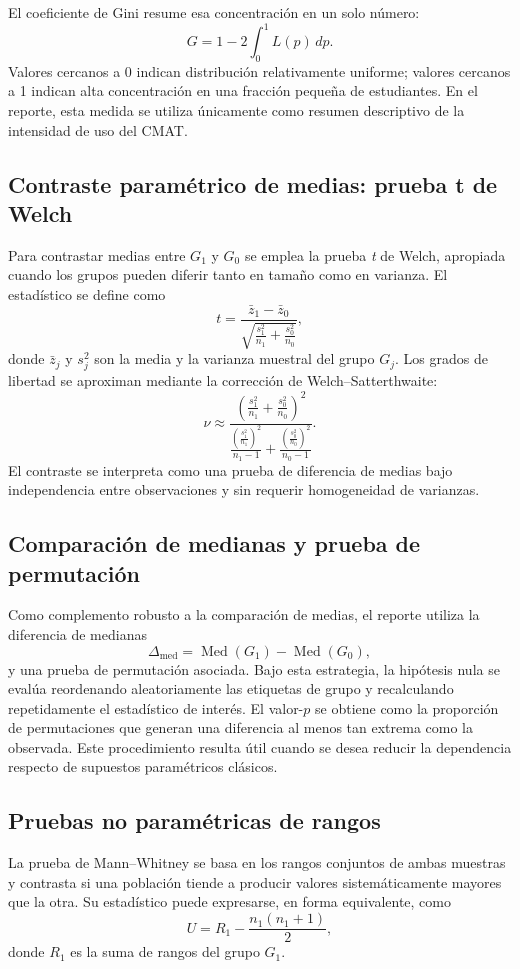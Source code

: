 \documentclass[8pt,a4paper]{article} %
\numberwithin{figure}{subsection}
\begin{document}
El coeficiente de Gini resume esa concentración en un solo número:
\[
G = 1 - 2\int_0^1 L(p)\,dp.
\]
Valores cercanos a 0 indican distribución relativamente uniforme; valores cercanos a 1 indican alta concentración en una fracción pequeña de estudiantes. En el reporte, esta medida se utiliza únicamente como resumen descriptivo de la intensidad de uso del CMAT.

\subsection{Contraste paramétrico de medias: prueba t de Welch}
Para contrastar medias entre $G_1$ y $G_0$ se emplea la prueba \textit{t} de Welch, apropiada cuando los grupos pueden diferir tanto en tamaño como en varianza. El estadístico se define como
\[
t=\frac{\bar z_1-\bar z_0}{\sqrt{\frac{s_1^2}{n_1}+\frac{s_0^2}{n_0}}},
\]
donde $\bar z_j$ y $s_j^2$ son la media y la varianza muestral del grupo $G_j$. Los grados de libertad se aproximan mediante la corrección de Welch--Satterthwaite:
\[
\nu \approx
\frac{\left(\frac{s_1^2}{n_1}+\frac{s_0^2}{n_0}\right)^2}
{\frac{\left(\frac{s_1^2}{n_1}\right)^2}{n_1-1}+\frac{\left(\frac{s_0^2}{n_0}\right)^2}{n_0-1}}.
\]
El contraste se interpreta como una prueba de diferencia de medias bajo independencia entre observaciones y sin requerir homogeneidad de varianzas.

\subsection{Comparación de medianas y prueba de permutación}
Como complemento robusto a la comparación de medias, el reporte utiliza la diferencia de medianas
\[
\Delta_{\mathrm{med}}=\operatorname{Med}(G_1)-\operatorname{Med}(G_0),
\]
y una prueba de permutación asociada. Bajo esta estrategia, la hipótesis nula se evalúa reordenando aleatoriamente las etiquetas de grupo y recalculando repetidamente el estadístico de interés. El valor-$p$ se obtiene como la proporción de permutaciones que generan una diferencia al menos tan extrema como la observada. Este procedimiento resulta útil cuando se desea reducir la dependencia respecto de supuestos paramétricos clásicos.

\subsection{Pruebas no paramétricas de rangos}
La prueba de Mann--Whitney se basa en los rangos conjuntos de ambas muestras y contrasta si una población tiende a producir valores sistemáticamente mayores que la otra. Su estadístico puede expresarse, en forma equivalente, como
\[
U = R_1-\frac{n_1(n_1+1)}{2},
\]
donde $R_1$ es la suma de rangos del grupo $G_1$.
\end{document}

